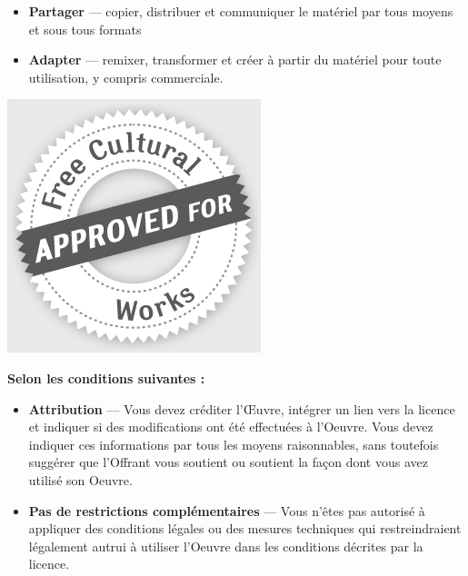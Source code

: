 {\begin{frame}[plain]
\begin{tcolorbox}[colback=my-grey,
		colframe=my-grey,  
		center, arc=0pt,outer arc=0pt,
		valign=top, 
		halign=left,
		width=\textwidth]
		\begin{minipage}{0.83\textwidth}
			\begin{itemize}
				\item[] \textbf{Partager} — copier, distribuer et communiquer le matériel par tous moyens et sous tous formats
				\item[] \textbf{Adapter} — remixer, transformer et créer à partir du matériel
				pour toute utilisation, y compris commerciale.
			\end{itemize}
		\end{minipage}
		\begin{minipage}{0.15\textwidth}
			\includegraphics[width=\textwidth]{../img/licence/FreeCulturalWorks_seal_x2.jpg}
		\end{minipage}
	
		
		\begin{center}
			\bfseries\Large
			Selon les conditions suivantes :
		\end{center}
		
		\begin{itemize}
			\item[] \textbf{Attribution} — Vous devez créditer l'Œuvre, intégrer un lien vers la licence et indiquer si des modifications ont été effectuées à l'Oeuvre. Vous devez indiquer ces informations par tous les moyens raisonnables, sans toutefois suggérer que l'Offrant vous soutient ou soutient la façon dont vous avez utilisé son Oeuvre. 
			\item[] \textbf{Pas de restrictions complémentaires} — Vous n'êtes pas autorisé à appliquer des conditions légales ou des mesures techniques qui restreindraient légalement autrui à utiliser l'Oeuvre dans les conditions décrites par la licence.
		\end{itemize}
		

\end{tcolorbox}
\end{frame}}
